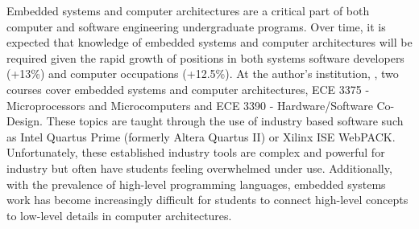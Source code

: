 \begin{comment}
\item Has anyone else done anything similar?
\begin{itemize}
\item Yes. 
\end{itemize}
\item Is your research relevant to research/practice/theory in your field?
\begin{itemize}
\item Education is always required
\item Improvements are required as IoT increases and devices are moving back towards small
microelectronics
\end{itemize}
\item What is already known or understood about this topic?
\begin{itemize}
\item Simulations: \cite{Tappan2009}, \cite{Skrien2001}, \cite{Skillen2011}
\item Curriculum: 
\end{itemize}
\item How might your research add to this understanding, or challenge existing theories and beliefs?
\begin{itemize}
\item Extend on existing solution
\item Propose opportunity to replace multiple configurations, not a single one
\end{itemize}
\end{itemize}
\end{comment}

Embedded systems and computer architectures are a critical part of both computer and software engineering undergraduate programs\cite{cec2016, sec2015, ece-ce-program, Ristov2011, Stolikj2011}. Over time, it is expected that knowledge of embedded systems and computer architectures will be required given the rapid growth of positions in both systems software developers (+13\%) and computer occupations (+12.5\%)\cite{bls2014}. At the author's institution, \uwo{}, two courses cover embedded systems and computer architectures, ECE 3375 - Microprocessors and Microcomputers and ECE 3390 - Hardware/Software Co-Design\cite{eceOutlines}. These topics are taught through the use of industry based software such as Intel Quartus Prime (formerly Altera Quartus II)\cite{quartus} or Xilinx ISE WebPACK\cite{xilinxISE}. Unfortunately, these established industry tools are complex and powerful for industry but often have students feeling overwhelmed under use. Additionally, with the prevalence of high-level programming languages, embedded systems work has become increasingly difficult for students to connect high-level concepts to low-level details in computer architectures. 

